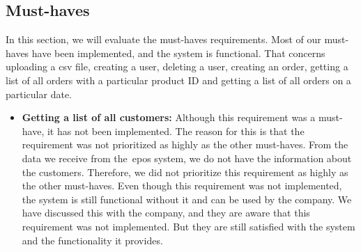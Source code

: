 \subsection{Must-haves}\label{subsec:must-haves}

In this section, we will evaluate the must-haves requirements.
Most of our must-haves have been implemented, and the system is functional.
That concerns uploading a csv file, creating a user, deleting a user, creating an order, getting a list of all orders
with a particular product ID and getting a list of all orders on a particular date.

\begin{itemize}
    \item \textbf{Getting a list of all customers:}
    Although this requirement was a must-have, it has not been implemented.
    The reason for this is that the requirement was not prioritized as highly as the other must-haves.
    From the data we receive from the~\acrshort{epos} system, we do not have the information about the customers.
    Therefore, we did not prioritize this requirement as highly as the other must-haves.
    Even though this requirement was not implemented, the system is still functional without it and can be used by the
    company. %
    We have discussed this with the company, and they are aware that this requirement was not implemented.
    But they are still satisfied with the system and the functionality it provides.
\end{itemize}
